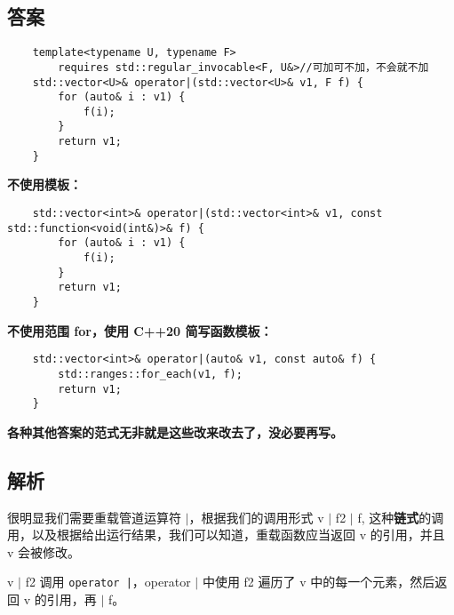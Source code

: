 

\subsection{答案}

\begin{verbatim}
    template<typename U, typename F>
        requires std::regular_invocable<F, U&>//可加可不加，不会就不加
    std::vector<U>& operator|(std::vector<U>& v1, F f) {
        for (auto& i : v1) {
            f(i);
        }
        return v1;
    }
\end{verbatim}

\textbf{不使用模板：}

\begin{verbatim}
    std::vector<int>& operator|(std::vector<int>& v1, const std::function<void(int&)>& f) {
        for (auto& i : v1) {
            f(i);
        }
        return v1;
    }
\end{verbatim}

\textbf{不使用范围 for，使用 C++20 简写函数模板：}

\begin{verbatim}
    std::vector<int>& operator|(auto& v1, const auto& f) {
        std::ranges::for_each(v1, f);
        return v1;
    }
\end{verbatim}

\textbf{各种其他答案的范式无非就是这些改来改去了，没必要再写。}

\subsection{解析}

很明显我们需要重载管道运算符 $|$，根据我们的调用形式 v $|$ f2 $|$ f,
这种\textbf{链式}的调用，以及根据给出运行结果，我们可以知道，重载函数应当返回 v 的引用，并且 v 会被修改。

v $|$ f2 调用 \texttt{operator |}，operator $|$ 中使用 f2 遍历了 v 中的每一个元素，然后返回 v 的引用，再 $|$ f。

\clearpage
